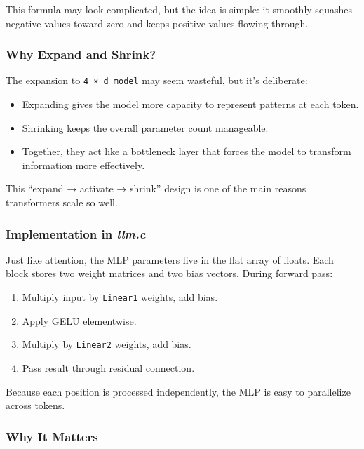\documentclass[
  letterpaper,
  DIV=11,
  numbers=noendperiod]{scrreprt}
\providecommand{\tightlist}{%
  \setlength{\itemsep}{0pt}\setlength{\parskip}{0pt}}
\begin{document}
This formula may look complicated, but the idea is simple: it smoothly
squashes negative values toward zero and keeps positive values flowing
through.

\subsubsection{Why Expand and Shrink?}\label{why-expand-and-shrink}

The expansion to \texttt{4\ ×\ d\_model} may seem wasteful, but it's
deliberate:

\begin{itemize}
\tightlist
\item
  Expanding gives the model more capacity to represent patterns at each
  token.
\item
  Shrinking keeps the overall parameter count manageable.
\item
  Together, they act like a bottleneck layer that forces the model to
  transform information more effectively.
\end{itemize}

This ``expand → activate → shrink'' design is one of the main reasons
transformers scale so well.

\subsubsection{\texorpdfstring{Implementation in
\emph{llm.c}}{Implementation in llm.c}}\label{implementation-in-llm.c-1}

Just like attention, the MLP parameters live in the flat array of
floats. Each block stores two weight matrices and two bias vectors.
During forward pass:

\begin{enumerate}
\def\labelenumi{\arabic{enumi}.}
\tightlist
\item
  Multiply input by \texttt{Linear1} weights, add bias.
\item
  Apply GELU elementwise.
\item
  Multiply by \texttt{Linear2} weights, add bias.
\item
  Pass result through residual connection.
\end{enumerate}

Because each position is processed independently, the MLP is easy to
parallelize across tokens.

\subsubsection{Why It Matters}\label{why-it-matters-12}
\end{document}
